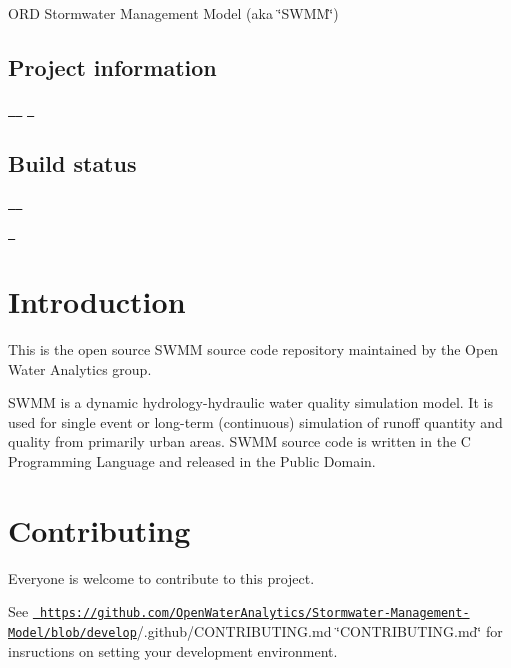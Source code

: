 O\+RD Stormwater Management Model (aka \char`\"{}\+S\+W\+M\+M\char`\"{})

\subsection*{Project information}

\href{https://github.com/OpenWaterAnalytics/Stormwater-Management-Model}{\texttt{ }} \href{https://gitter.im/OpenWaterAnalytics/lobby}{\texttt{ }} \href{http://wateranalytics.org/Stormwater-Management-Model/}{\texttt{ }}

\subsection*{Build status}

\href{https://ci.appveyor.com/project/OpenWaterAnalytics/stormwater-management-model/branch/develop}{\texttt{ }} \href{https://travis-ci.org/OpenWaterAnalytics/Stormwater-Management-Model}{\texttt{ }}

\href{https://codecov.io/gh/OpenWaterAnalytics/Stormwater-Management-Model}{\texttt{ }}

\section*{Introduction}

This is the open source S\+W\+MM source code repository maintained by the Open Water Analytics group.

S\+W\+MM is a dynamic hydrology-\/hydraulic water quality simulation model. It is used for single event or long-\/term (continuous) simulation of runoff quantity and quality from primarily urban areas. S\+W\+MM source code is written in the C Programming Language and released in the Public Domain.

\section*{Contributing}

Everyone is welcome to contribute to this project.

See \href{https://github.com/OpenWaterAnalytics/Stormwater-Management-Model/blob/develop}{\texttt{ https\+://github.\+com/\+Open\+Water\+Analytics/\+Stormwater-\/\+Management-\/\+Model/blob/develop}}/.github/\+C\+O\+N\+T\+R\+I\+B\+U\+T\+I\+N\+G.\+md \char`\"{}\+C\+O\+N\+T\+R\+I\+B\+U\+T\+I\+N\+G.\+md\char`\"{} for insructions on setting your development environment.


